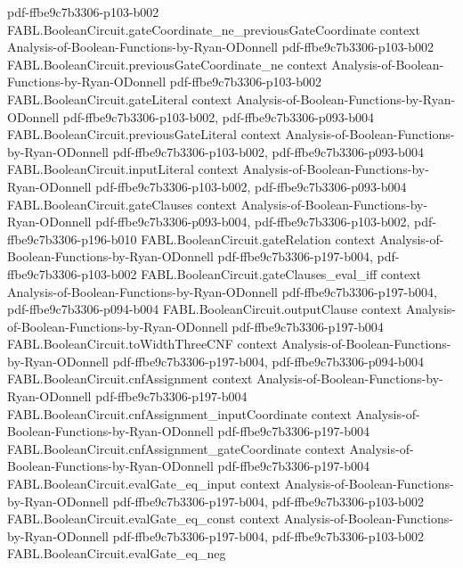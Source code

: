 \begin{theorem}
  {pdf-ffbe9c7b3306-p103-b002}
\proofstep
  {FABL.BooleanCircuit.gateCoordinate_ne_previousGateCoordinate}
  {context}
  {Analysis-of-Boolean-Functions-by-Ryan-ODonnell}
  {pdf-ffbe9c7b3306-p103-b002}
\proofstep
  {FABL.BooleanCircuit.previousGateCoordinate_ne}
  {context}
  {Analysis-of-Boolean-Functions-by-Ryan-ODonnell}
  {pdf-ffbe9c7b3306-p103-b002}
\proofstep
  {FABL.BooleanCircuit.gateLiteral}
  {context}
  {Analysis-of-Boolean-Functions-by-Ryan-ODonnell}
  {pdf-ffbe9c7b3306-p103-b002,
    pdf-ffbe9c7b3306-p093-b004}
\proofstep
  {FABL.BooleanCircuit.previousGateLiteral}
  {context}
  {Analysis-of-Boolean-Functions-by-Ryan-ODonnell}
  {pdf-ffbe9c7b3306-p103-b002,
    pdf-ffbe9c7b3306-p093-b004}
\proofstep
  {FABL.BooleanCircuit.inputLiteral}
  {context}
  {Analysis-of-Boolean-Functions-by-Ryan-ODonnell}
  {pdf-ffbe9c7b3306-p103-b002,
    pdf-ffbe9c7b3306-p093-b004}
\proofstep
  {FABL.BooleanCircuit.gateClauses}
  {context}
  {Analysis-of-Boolean-Functions-by-Ryan-ODonnell}
  {pdf-ffbe9c7b3306-p093-b004,
    pdf-ffbe9c7b3306-p103-b002,
    pdf-ffbe9c7b3306-p196-b010}
\proofstep
  {FABL.BooleanCircuit.gateRelation}
  {context}
  {Analysis-of-Boolean-Functions-by-Ryan-ODonnell}
  {pdf-ffbe9c7b3306-p197-b004,
    pdf-ffbe9c7b3306-p103-b002}
\proofstep
  {FABL.BooleanCircuit.gateClauses_eval_iff}
  {context}
  {Analysis-of-Boolean-Functions-by-Ryan-ODonnell}
  {pdf-ffbe9c7b3306-p197-b004,
    pdf-ffbe9c7b3306-p094-b004}
\proofstep
  {FABL.BooleanCircuit.outputClause}
  {context}
  {Analysis-of-Boolean-Functions-by-Ryan-ODonnell}
  {pdf-ffbe9c7b3306-p197-b004}
\proofstep
  {FABL.BooleanCircuit.toWidthThreeCNF}
  {context}
  {Analysis-of-Boolean-Functions-by-Ryan-ODonnell}
  {pdf-ffbe9c7b3306-p197-b004,
    pdf-ffbe9c7b3306-p094-b004}
\proofstep
  {FABL.BooleanCircuit.cnfAssignment}
  {context}
  {Analysis-of-Boolean-Functions-by-Ryan-ODonnell}
  {pdf-ffbe9c7b3306-p197-b004}
\proofstep
  {FABL.BooleanCircuit.cnfAssignment_inputCoordinate}
  {context}
  {Analysis-of-Boolean-Functions-by-Ryan-ODonnell}
  {pdf-ffbe9c7b3306-p197-b004}
\proofstep
  {FABL.BooleanCircuit.cnfAssignment_gateCoordinate}
  {context}
  {Analysis-of-Boolean-Functions-by-Ryan-ODonnell}
  {pdf-ffbe9c7b3306-p197-b004}
\proofstep
  {FABL.BooleanCircuit.evalGate_eq_input}
  {context}
  {Analysis-of-Boolean-Functions-by-Ryan-ODonnell}
  {pdf-ffbe9c7b3306-p197-b004,
    pdf-ffbe9c7b3306-p103-b002}
\proofstep
  {FABL.BooleanCircuit.evalGate_eq_const}
  {context}
  {Analysis-of-Boolean-Functions-by-Ryan-ODonnell}
  {pdf-ffbe9c7b3306-p197-b004,
    pdf-ffbe9c7b3306-p103-b002}
\proofstep
  {FABL.BooleanCircuit.evalGate_eq_neg}

\end{theorem}
